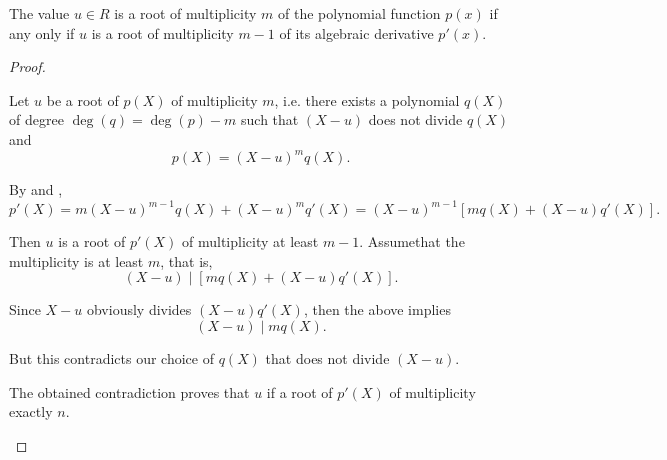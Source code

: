 \begin{corollary}\label{thm:repeated_root_iff_derivatives_divisible}
  The value \( u \in R \) is a root of multiplicity \( m \) of the polynomial function \( p(x) \) if any only if \( u \) is a root of multiplicity \( m - 1 \) of its algebraic derivative \( p'(x) \).
\end{corollary}
\begin{proof}\mbox{}
  \begin{description}
    \Implies Let \( u \) be a root of \( p(X) \) of multiplicity \( m \), i.e. there exists a polynomial \( q(X) \) of degree \( \deg(q) = \deg(p) - m \) such that \( (X - u) \) does not divide \( q(X) \) and
    \begin{equation*}
      p(X) = (X - u)^m q(X).
    \end{equation*}

    By  and ,
    \begin{equation*}
      p'(X)
      =
      m (X - u)^{m-1} q(X) + (X - u)^m q'(X)
      =
      (X - u)^{m-1} [m q(X) + (X - u) q'(X)].
    \end{equation*}

    Then \( u \) is a root of \( p'(X) \) of multiplicity at least \( m - 1 \). Assume\LEM that the multiplicity is at least \( m \), that is,
    \begin{equation*}
      (X - u) \mid [mq(X) + (X - u) q'(X)].
    \end{equation*}

    Since \( X - u \) obviously divides \( (X - u) q'(X) \), then the above implies
    \begin{equation*}
      (X - u) \mid mq(X).
    \end{equation*}

    But this contradicts our choice of \( q(X) \) that does not divide \( (X - u) \).

    The obtained contradiction proves that \( u \) if a root of \( p'(X) \) of multiplicity exactly \( n \).
  \end{description}
\end{proof}

